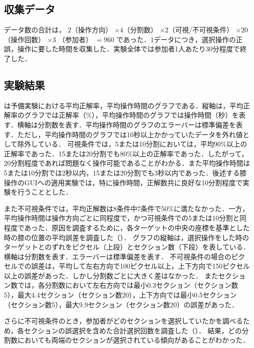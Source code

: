 \documentclass[submit, techrep]{ipsj}
\begin{document}
\subsection{収集データ}
データ数の合計は，
$2$（操作方向） $\times 4$（分割数） $\times 2$（可視/不可視条件） $\times 20$（操作回数） $\times 3$ （参加者） $= 960$
であった．1データにつき，選択操作の正誤，操作に要した時間を収集した．実験全体では参加者1人あたり30分程度で終了した．

\subsection{実験結果}
は予備実験における平均正解率，平均操作時間のグラフである．縦軸は，平均正解率のグラフでは正解率（$\%$），平均操作時間のグラフでは操作時間（秒）を表す．横軸は分割数を表す．平均操作時間のグラフのエラーバーは標準偏差を表す．ただし，平均操作時間のグラフでは10秒以上かかっていたデータを外れ値として除外している．
可視条件では，5または10分割においては，平均90\%以上の正解率であった．15または20分割でも80\%以上の正解率であった．したがって，20分割程度であれば問題なく操作可能であることがわかる．また平均操作時間は5または10分割では2秒以内，15または20分割でも3秒以内であった．後述する膝操作のGUIへの適用実験では，特に操作時間，正解数共に良好な10分割程度で実験を行うこととした．
\par
また不可視条件では，平均正解数は8条件中7条件で50\%に満たなかった．一方，平均操作時間は操作方向ごとに同程度で，かつ可視条件での5または10分割と同程度であった．原因を調査するために，各ターゲットの中央の座標を基準とした時の膝の位置の平均誤差を調査した（）．
グラフの縦軸は，選択操作をした時のターゲットとのずれをピクセル（上段）とセクション数（下段）を表している．横軸は分割数を表す．エラーバーは標準偏差を表す．
不可視条件の場合のピクセルでの誤差は，平均して左右方向で100ピクセル以上，上下方向で150ピクセル以上の誤差があった．しかし分割数ごとに大きく差はなかった．
またセクション数では，各分割数において左右方向では最小0.3セクション（セクション数5），最大4.4セクション（セクション数20），上下方向では最小0.5セクション（セクション数5），最大9.9セクション（セクション数20）の誤差があった．\par
さらに不可視条件のとき，参加者がどのセクションを選択していたかを調べるため，各セクションの誤選択を含めた合計選択回数を調査した（）．
結果，どの分割数においても両端のセクションが選択されている傾向があることがわかった．
\par
\end{document}
